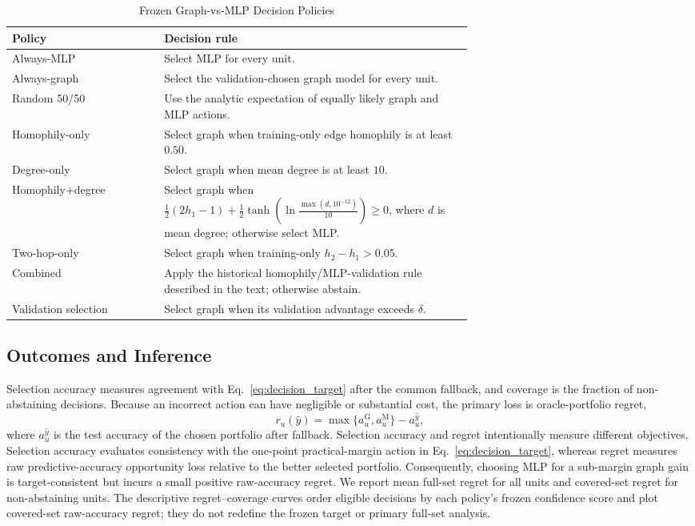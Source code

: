 \begin{table}[t]
\centering
\caption{Frozen Graph-vs-MLP Decision Policies}
\label{tab:diagnostic_policies}
\small
\begin{tabular}{@{}lp{0.67\linewidth}@{}}
\toprule
Policy & Decision rule \\
\midrule
Always-MLP & Select MLP for every unit. \\
Always-graph & Select the validation-chosen graph model for every unit. \\
Random 50/50 & Use the analytic expectation of equally likely graph and MLP actions. \\
Homophily-only & Select graph when training-only edge homophily is at least $0.50$. \\
Degree-only & Select graph when mean degree is at least $10$. \\
Homophily+degree & Select graph when $\tfrac12(2h_1-1)+\tfrac12\tanh\!\left(\ln\!\frac{\max(d,10^{-12})}{10}\right)\geq0$, where $d$ is mean degree; otherwise select MLP. \\
Two-hop-only & Select graph when training-only $h_2-h_1>0.05$. \\
Combined & Apply the historical homophily/MLP-validation rule described in the text; otherwise abstain. \\
Validation selection & Select graph when its validation advantage exceeds $\delta$. \\
\bottomrule
\end{tabular}
\end{table}

\subsection{Outcomes and Inference}

Selection accuracy measures agreement with Eq.~\eqref{eq:decision_target} after the common fallback, and coverage is the fraction of non-abstaining decisions. Because an incorrect action can have negligible or substantial cost, the primary loss is oracle-portfolio regret,
\begin{equation}
r_u(\widehat{y})=\max\{a_u^{\mathrm{G}},a_u^{\mathrm{M}}\}-a_u^{\widehat{y}},
\label{eq:oracle_regret}
\end{equation}
where $a_u^{\widehat{y}}$ is the test accuracy of the chosen portfolio after fallback. Selection accuracy and regret intentionally measure different objectives. Selection accuracy evaluates consistency with the one-point practical-margin action in Eq.~\eqref{eq:decision_target}, whereas regret measures raw predictive-accuracy opportunity loss relative to the better selected portfolio. Consequently, choosing MLP for a sub-margin graph gain is target-consistent but incurs a small positive raw-accuracy regret. We report mean full-set regret for all units and covered-set regret for non-abstaining units. The descriptive regret--coverage curves order eligible decisions by each policy's frozen confidence score and plot covered-set raw-accuracy regret; they do not redefine the frozen target or primary full-set analysis.

